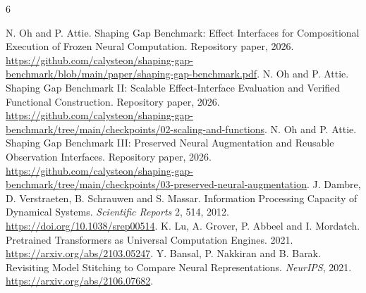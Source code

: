\documentclass[11pt]{article}
\begin{document}
\begin{thebibliography}{6}\raggedright
{} N. Oh and P. Attie. Shaping Gap Benchmark: Effect Interfaces for Compositional Execution of Frozen Neural Computation. Repository paper, 2026. \url{https://github.com/calysteon/shaping-gap-benchmark/blob/main/paper/shaping-gap-benchmark.pdf}.
 N. Oh and P. Attie. Shaping Gap Benchmark II: Scalable Effect-Interface Evaluation and Verified Functional Construction. Repository paper, 2026. \url{https://github.com/calysteon/shaping-gap-benchmark/tree/main/checkpoints/02-scaling-and-functions}.
 N. Oh and P. Attie. Shaping Gap Benchmark III: Preserved Neural Augmentation and Reusable Observation Interfaces. Repository paper, 2026. \url{https://github.com/calysteon/shaping-gap-benchmark/tree/main/checkpoints/03-preserved-neural-augmentation}.
 J. Dambre, D. Verstraeten, B. Schrauwen and S. Massar. Information Processing Capacity of Dynamical Systems. \emph{Scientific Reports} 2, 514, 2012. \url{https://doi.org/10.1038/srep00514}.
 K. Lu, A. Grover, P. Abbeel and I. Mordatch. Pretrained Transformers as Universal Computation Engines. 2021. \url{https://arxiv.org/abs/2103.05247}.
 Y. Bansal, P. Nakkiran and B. Barak. Revisiting Model Stitching to Compare Neural Representations. \emph{NeurIPS}, 2021. \url{https://arxiv.org/abs/2106.07682}.
\end{thebibliography}
\end{document}
